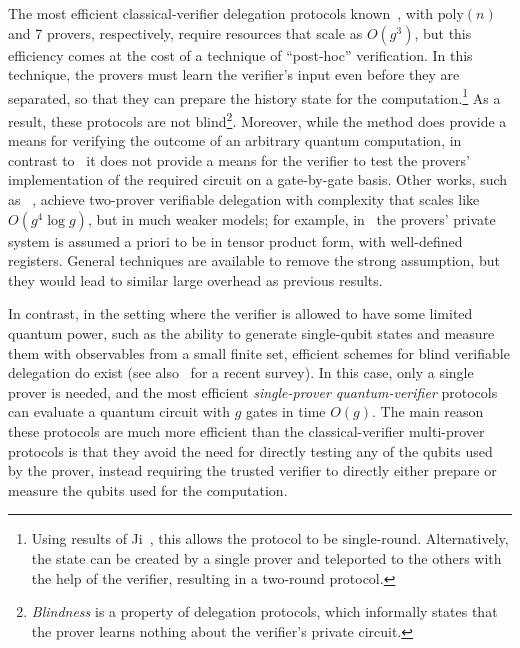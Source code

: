 The most efficient classical-verifier delegation protocols known~\cite{hajdusek2015posthoc,natarajan2016robust}, with $\mathrm{poly}(n)$ and 7 provers, respectively,
require resources that scale as $O(g^3)$, but this efficiency comes at the cost of a technique of ``post-hoc''
verification. In this technique, the provers must learn the
verifier's input even before they are separated, so that they can prepare the
history state for the computation.\footnote{Using results of Ji~\cite{Ji16},
this allows the protocol to be single-round. Alternatively, the state can be created by a single prover and teleported to the others with the help of the verifier, resulting in a two-round protocol.} As a result, these protocols are not blind\footnote{
\emph{Blindness} is a property of delegation protocols, which informally states that the prover learns nothing about the verifier's private circuit.}. 
Moreover, while the method does provide a means for verifying the outcome
of an arbitrary quantum computation, in contrast
to~\cite{reichardt2012classical} it does not provide a means for the verifier to test the provers' implementation of the
required circuit on a gate-by-gate basis. 
Other works, such as ~\cite{HayashiH16},
achieve two-prover verifiable delegation with complexity that scales like $O(g^4\log g)$,  but in much weaker models; for example, in~\cite{HayashiH16} the provers' private system is assumed a priori to be in tensor product form, with well-defined registers.  General techniques are available to remove the strong assumption, but they would lead to similar large overhead as previous results.

In contrast, in the setting where the verifier is allowed to have some limited quantum power, such as the ability to generate single-qubit states and measure them with observables from a small finite set, efficient schemes for blind verifiable delegation do exist \cite{aharonov10qpip,fitzsimons12vubqc,Morimae14,broadbent15howtoverify,HayashiM15,MF16,FujiiH17,MorimaeTH17} (see also~\cite{fitzsimons2016survey} for a recent survey). In this case, only a single prover is needed, and the most efficient \emph{single-prover quantum-verifier} protocols can evaluate a quantum circuit with $g$ gates in time $O(g)$. The main reason these protocols are much more efficient than the classical-verifier multi-prover protocols is that they avoid the need for directly testing any of the qubits used by the prover, instead requiring the trusted verifier to directly either prepare or measure the qubits used for the computation. 


